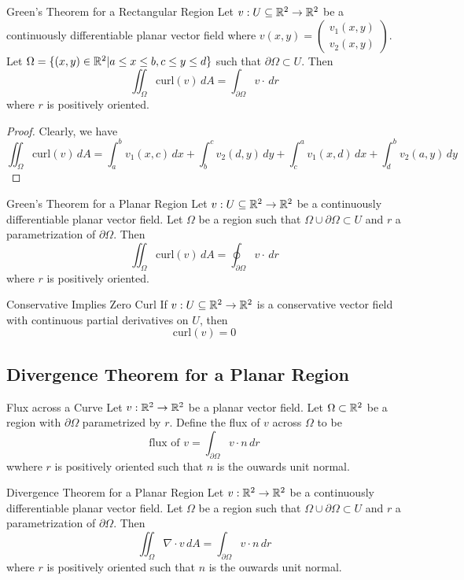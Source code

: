 \documentclass[a4paper]{article}
\begin{document}
\begin{thm}{Green's Theorem for a Rectangular Region}{} Let $v:U\subseteq\mathbb{R}^2\to\mathbb{R}^2$ be a continuously differentiable planar vector field where $v(x,y)=\begin{pmatrix}v_1(x,y)\\v_2(x,y)\end{pmatrix}$. Let $\Omega=\{(x,y)\in\mathbb{R}^2|a\leq x\leq b,c\leq y\leq d\}$ such that $\partial\Omega\subset U$. Then $$\iint_\Omega\text{curl}(v)\,dA=\int_{\partial\Omega}v\cdot\,dr$$ where $r$ is positively oriented. 
\begin{proof}
Clearly, we have $$\iint_\Omega\text{curl}(v)\,dA=\int_a^bv_1(x,c)\,dx+\int_b^cv_2(d,y)\,dy+\int_c^av_1(x,d)\,dx+\int_d^bv_2(a,y)\,dy$$
\end{proof}
\end{thm}

\begin{thm}{Green's Theorem for a Planar Region}{} Let $v:U\subseteq\mathbb{R}^2\to\mathbb{R}^2$ be a continuously differentiable planar vector field. Let $\Omega$ be a region such that $\Omega\cup\partial\Omega\subset U$ and $r$ a parametrization of $\partial\Omega$. Then $$\iint_\Omega\text{curl}(v)\,dA=\oint_{\partial\Omega}v\cdot\,dr$$ where $r$ is positively oriented. 
\end{thm}

\begin{thm}{Conservative Implies Zero Curl}{} If $v:U\subseteq\mathbb{R}^2\to\mathbb{R}^2$ is a conservative vector field with continuous partial derivatives on $U$, then $$\text{curl}(v)=0$$
\end{thm}

\subsection{Divergence Theorem for a Planar Region}
\begin{defn}{Flux across a Curve}{} Let $v:\mathbb{R}^2\to\mathbb{R}^2$ be a planar vector field. Let $\Omega\subset\mathbb{R}^2$ be a region with $\partial\Omega$ parametrized by $r$. Define the flux of $v$ across $\Omega$ to be $$\text{flux of }v=\int_{\partial\Omega}v\cdot n\,dr$$ wwhere $r$ is positively oriented such that $n$ is the ouwards unit normal. 
\end{defn}

\begin{thm}{Divergence Theorem for a Planar Region}{} Let $v:\mathbb{R}^2\to\mathbb{R}^2$ be a continuously differentiable planar vector field. Let $\Omega$ be a region such that $\Omega\cup\partial\Omega\subset U$ and $r$ a parametrization of $\partial\Omega$. Then $$\iint_{\Omega}\nabla\cdot v\,dA=\int_{\partial\Omega}v\cdot n\,dr$$ where $r$ is positively oriented such that $n$ is the ouwards unit normal. 
\end{thm}
\end{document}
